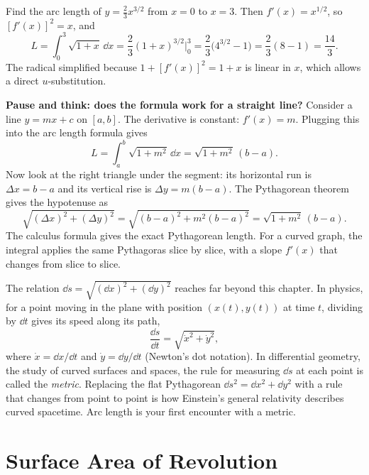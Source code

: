 \begin{example}
\label{ch26:ex-arclen}
Find the arc length of $y = \tfrac{2}{3}x^{3/2}$ from $x=0$ to $x=3$. Then
$f'(x) = x^{1/2}$, so $[f'(x)]^2 = x$, and
\[
  L = \int_0^3 \sqrt{1+x}\,\dd x
    = \frac{2}{3}(1+x)^{3/2}\Big|_0^3
    = \frac{2}{3}\bigl(4^{3/2} - 1\bigr)
    = \frac{2}{3}(8-1) = \frac{14}{3}.
\]
The radical simplified because $1+[f'(x)]^2 = 1+x$ is linear in $x$, which allows a
direct $u$-substitution.
\end{example}

\begin{recoverybox}
\textbf{Pause and think: does the formula work for a straight line?}
Consider a line $y = mx + c$ on $[a,b]$. The derivative is constant: $f'(x) = m$.
Plugging this into the arc length formula gives
\[
  L = \int_a^b \sqrt{1 + m^2}\,\dd x = \sqrt{1 + m^2}\,(b - a).
\]
Now look at the right triangle under the segment: its horizontal run is $\Delta x = b - a$
and its vertical rise is $\Delta y = m(b - a)$. The Pythagorean theorem gives the hypotenuse
as
\[
  \sqrt{(\Delta x)^2 + (\Delta y)^2} = \sqrt{(b-a)^2 + m^2(b-a)^2} = \sqrt{1+m^2}\,(b-a).
\]
The calculus formula gives the exact Pythagorean length. For a curved graph, the
integral applies the same Pythagoras slice by slice, with a slope $f'(x)$ that
changes from slice to slice.
\end{recoverybox}

\begin{connectionbox}
The relation $\dd s = \sqrt{(\dd x)^2 + (\dd y)^2}$ reaches far beyond this
chapter. In physics, for a point moving in the plane with position $(x(t),y(t))$ at
time $t$, dividing by $\dd t$ gives its speed along its path,
\[
  \frac{\dd s}{\dd t} = \sqrt{\dot x^2 + \dot y^2},
\]
where $\dot x = \dd x/\dd t$ and $\dot y = \dd y/\dd t$ (Newton's dot notation).
In differential geometry, the study of curved surfaces and spaces, the rule for
measuring $\dd s$ at each point is called the \emph{metric}. Replacing the flat
Pythagorean $\dd s^2 = \dd x^2 + \dd y^2$ with a rule that changes from point to
point is how Einstein's general relativity describes curved spacetime. Arc length
is your first encounter with a metric.
\end{connectionbox}

\section{Surface Area of Revolution}
\label{ch26:surface}


